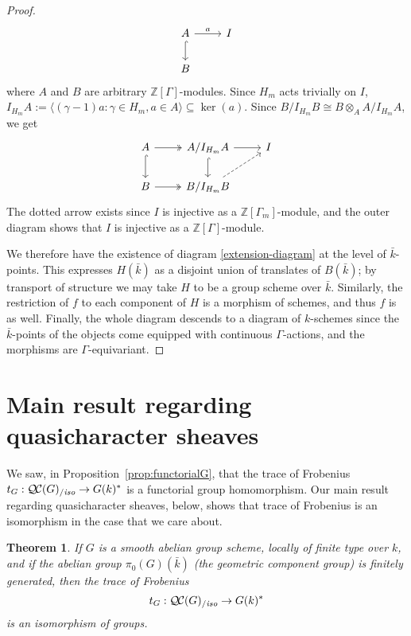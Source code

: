 \documentclass[11pt]{amsart}
\theoremstyle{plain}
\newtheorem{theorem}{Theorem}[section]
\theoremstyle{definition}
\theoremstyle{remark}
\newcommand{\ZZ}{{\mathbb{Z}}}
\newcommand{\bFq}{\bar{k}}
\newcommand{\Fq}{k}
\newcommand{\QC}{{\mathcal{Q\hskip-0.8pt C}}}
\newcommand{\QCiso}[1]{\QC(#1)_{/\textit{iso}}}
\newcommand{\trFrob}[1]{t_{#1}}
\begin{document}
\begin{proof}
  \[
  \begin{tikzcd}
  A \rar{a} \arrow[hook]{d} & I \\
  B
  \end{tikzcd}
  \]
  where $A$ and $B$ are arbitrary $\ZZ[\Gamma]$-modules.  Since $H_m$ acts trivially on $I$,
  $I_{H_m}A := \langle (\gamma-1)a : \gamma \in H_m, a \in A \rangle \subseteq \ker(a).$
  Since $B / I_{H_m}B \cong B \otimes_A A / I_{H_m}A$, we get
  \[
  \begin{tikzcd}
  A \arrow[two heads]{r} \arrow[hook]{d} & A/I_{H_m}A \rar \arrow[hook]{d} & I \\
  B \arrow[two heads]{r} & B/I_{H_m}B \arrow[dashed]{ur} & {}
  \end{tikzcd}
  \]
  The dotted arrow exists since $I$ is injective as a
  $\ZZ[\Gamma_m]$-module, and the outer diagram shows that $I$ is
  injective as a $\ZZ[\Gamma]$-module.

  We therefore have the existence of diagram \eqref{extension-diagram}
  at the level of $\bFq$-points.  This expresses $H(\bFq)$ as a
  disjoint union of translates of $B(\bFq)$; by transport of structure
  we may take $H$ to be a group scheme over $\bFq$.  Similarly, the
  restriction of $f$ to each component of $H$ is a morphism of
  schemes, and thus $f$ is as well.  Finally, the whole diagram
  descends to a diagram of $\Fq$-schemes since the $\bFq$-points of
  the objects come equipped with continuous $\Gamma$-actions, and the
  morphisms are $\Gamma$-equivariant.
\end{proof}

\section{Main result regarding quasicharacter sheaves}
\label{sec:snake}

We saw, in Proposition~\ref{prop:functorialG}, that the trace of Frobenius  $\trFrob{G} : \QCiso{G} \to G(\Fq)^*$ is a functorial group homomorphism. Our main result regarding quasicharacter sheaves, below, shows that trace of Frobenius is an isomorphism in the case that we care about.

%
\begin{theorem}\label{thm:snake}
  If $G$ is a smooth abelian group scheme, locally of finite type over
  $\Fq$, and if the abelian group $\pi_0(G)(\bFq)$ (the geometric
  component group) is finitely generated, then the trace of Frobenius
  \[
  \trFrob{G} : \QCiso{G} \to G(\Fq)^*
  \]
  is an isomorphism of groups.
\end{theorem}
\end{document}
